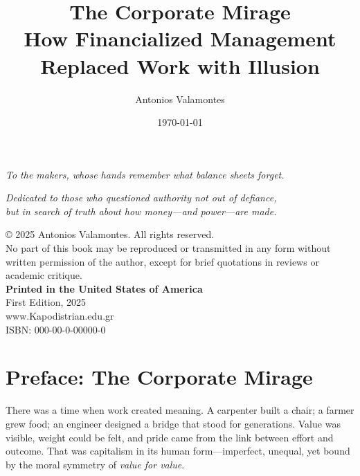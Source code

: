 \documentclass[11pt,twoside]{book}
\title{\textbf{The Corporate Mirage}\\\large How Financialized Management Replaced Work with Illusion}
\author{Antonios Valamontes}
\date{\today}
\begin{document}
\frontmatter
\maketitle

\cleardoublepage
\thispagestyle{empty}
\vspace*{\fill}
\begin{center}
\textit{To the makers, whose hands remember what balance sheets forget.}
\end{center}
\vspace*{\fill}
\cleardoublepage

\tableofcontents

\newpage
\thispagestyle{empty}
\vspace*{6cm}
\begin{center}
\textit{
Dedicated to those who questioned authority not out of defiance,\\
but in search of truth about how money—and power—are made.}
\end{center}

\newpage
\thispagestyle{empty}
\vspace*{2cm}
\noindent
© 2025 Antonios Valamontes. All rights reserved.\\[0.5em]
No part of this book may be reproduced or transmitted in any form without written permission of the author, except for brief quotations in reviews or academic critique.\\[1em]
\noindent
\textbf{Printed in the United States of America}\\
First Edition, 2025 \\

www.Kapodistrian.edu.gr\\

{\small ISBN: 000-00-0-00000-0}\\

\cleardoublepage
%
\chapter*{Preface: The Corporate Mirage}

There was a time when work created meaning. A carpenter built a chair; a farmer grew food; an engineer designed a bridge that stood for generations. Value was visible, weight could be felt, and pride came from the link between effort and outcome. That was capitalism in its human form---imperfect, unequal, yet bound by the moral symmetry of \emph{value for value}.
\end{document}
